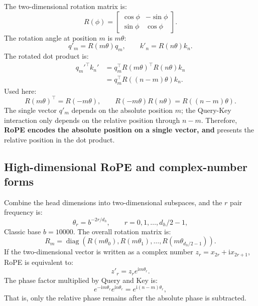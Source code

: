 \documentclass[UTF8,fontset=none,a4paper,10pt]{ctexart}
\newcommand{\term}[1]{\textbf{#1}}
\begin{document}
The two-dimensional rotation matrix is:
\begin{equation}
  R(\phi)=
  \begin{bmatrix}
    \cos\phi&-\sin\phi\\
    \sin\phi&\cos\phi
  \end{bmatrix}.
  \label{eq:rotation}
\end{equation}
The rotation angle at position $m$ is $m\theta$:
\begin{equation}
  q'_m=R(m\theta)q_m,\qquad k'_n=R(n\theta)k_n.
  \label{eq:rope-rotate}
\end{equation}
The rotated dot product is:
\begin{equation}
  \begin{aligned}
  q_m'^\top k_n'
  &=q_m^\top R(m\theta)^\top R(n\theta)k_n\\
  &=q_m^\top R((n-m)\theta)k_n.
  \end{aligned}
  \label{eq:rope-core}
\end{equation}
Used here:
\begin{equation}
  R(m\theta)^\top=R(-m\theta),\qquad
  R(-m\theta)R(n\theta)=R((n-m)\theta).
  \label{eq:rotation-group}
\end{equation}
The single vector $q'_m$ depends on the absolute position $m$; the Query-Key interaction only depends on the relative position through $n-m$. Therefore, \term{RoPE encodes the absolute position on a single vector, and } presents the relative position in the dot product.

\subsection{High-dimensional RoPE and complex-number forms}

Combine the head dimensions into two-dimensional subspaces, and the $r$ pair frequency is:
\begin{equation}
  \theta_r=b^{-2r/d_h},\qquad r=0,1,\ldots,d_h/2-1,
  \label{eq:rope-frequency}
\end{equation}
Classic base $b=10000$. The overall rotation matrix is:
\begin{equation}
  R_m=\operatorname{diag}\left(
  R(m\theta_0),R(m\theta_1),\ldots,R(m\theta_{d_h/2-1})
  \right).
  \label{eq:rope-block}
\end{equation}
If the two-dimensional vector is written as a complex number $z_r=x_{2r}+\mathrm{i}x_{2r+1}$, RoPE is equivalent to:
\begin{equation}
  z'_r=z_r e^{\mathrm{i}m\theta_r}.
  \label{eq:rope-complex}
\end{equation}
The phase factor multiplied by Query and Key is:
\begin{equation}
  e^{-\mathrm{i}m\theta_r}e^{\mathrm{i}n\theta_r}
  =e^{\mathrm{i}(n-m)\theta_r},
  \label{eq:rope-relative-phase}
\end{equation}
That is, only the relative phase remains after the absolute phase is subtracted.
\end{document}
